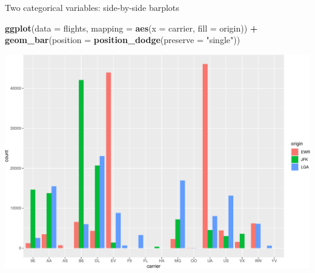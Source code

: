 \documentclass[
  ignorenonframetext,
]{beamer}
\newenvironment{Shaded}{\begin{snugshade}}{\end{snugshade}}
\newcommand{\AttributeTok}[1]{\textcolor[rgb]{0.13,0.29,0.53}{#1}}
\newcommand{\FunctionTok}[1]{\textcolor[rgb]{0.13,0.29,0.53}{\textbf{#1}}}
\newcommand{\NormalTok}[1]{#1}
\newcommand{\SpecialCharTok}[1]{\textcolor[rgb]{0.81,0.36,0.00}{\textbf{#1}}}
\newcommand{\StringTok}[1]{\textcolor[rgb]{0.31,0.60,0.02}{#1}}
\begin{document}
\begin{frame}[fragile]{Two categorical variables: side-by-side barplots}
\protect\hypertarget{two-categorical-variables-side-by-side-barplots-2}{}
\tiny

\begin{Shaded}
\begin{Highlighting}[]
\FunctionTok{ggplot}\NormalTok{(}\AttributeTok{data =}\NormalTok{ flights, }\AttributeTok{mapping =} \FunctionTok{aes}\NormalTok{(}\AttributeTok{x =}\NormalTok{ carrier, }\AttributeTok{fill =}\NormalTok{ origin)) }\SpecialCharTok{+}
  \FunctionTok{geom\_bar}\NormalTok{(}\AttributeTok{position =} \FunctionTok{position\_dodge}\NormalTok{(}\AttributeTok{preserve =} \StringTok{"single"}\NormalTok{))}
\end{Highlighting}
\end{Shaded}

\begin{center}\includegraphics[width=0.9\linewidth,height=0.5\textheight]{Week2_files/figure-beamer/unnamed-chunk-45-1} \end{center}
\normalsize
\end{frame}
\end{document}
